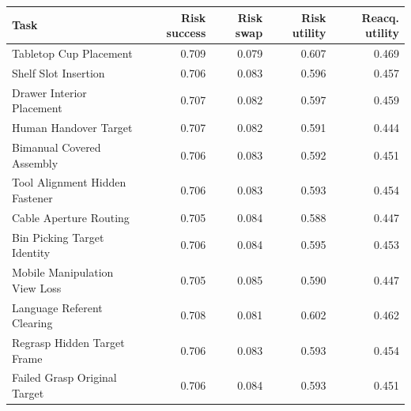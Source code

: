 \begin{tabular}{lrrrr}
\toprule
Task & Risk success & Risk swap & Risk utility & Reacq. utility \\
\midrule
Tabletop Cup Placement & 0.709 & 0.079 & 0.607 & 0.469 \\
Shelf Slot Insertion & 0.706 & 0.083 & 0.596 & 0.457 \\
Drawer Interior Placement & 0.707 & 0.082 & 0.597 & 0.459 \\
Human Handover Target & 0.707 & 0.082 & 0.591 & 0.444 \\
Bimanual Covered Assembly & 0.706 & 0.083 & 0.592 & 0.451 \\
Tool Alignment Hidden Fastener & 0.706 & 0.083 & 0.593 & 0.454 \\
Cable Aperture Routing & 0.705 & 0.084 & 0.588 & 0.447 \\
Bin Picking Target Identity & 0.706 & 0.084 & 0.595 & 0.453 \\
Mobile Manipulation View Loss & 0.705 & 0.085 & 0.590 & 0.447 \\
Language Referent Clearing & 0.708 & 0.081 & 0.602 & 0.462 \\
Regrasp Hidden Target Frame & 0.706 & 0.083 & 0.593 & 0.454 \\
Failed Grasp Original Target & 0.706 & 0.084 & 0.593 & 0.451 \\
\bottomrule
\end{tabular}
